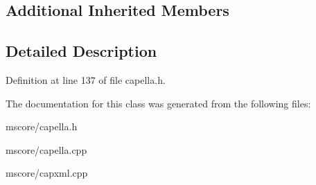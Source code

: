 \subsection*{Additional Inherited Members}


\subsection{Detailed Description}


Definition at line 137 of file capella.\+h.



The documentation for this class was generated from the following files\+:\begin{DoxyCompactItemize}
\item 
mscore/capella.\+h\item 
mscore/capella.\+cpp\item 
mscore/capxml.\+cpp\end{DoxyCompactItemize}
